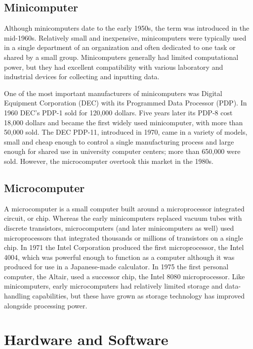 \documentclass[11pt,a4paper,twoside]{article}
\begin{document}
\subsection{Minicomputer}
Although minicomputers date to the early 1950s, the term was introduced in the mid-1960s. Relatively small and inexpensive, minicomputers were typically used in a single department of an organization and often dedicated to one task or shared by a small group. Minicomputers generally had limited computational power, but they had excellent compatibility with various laboratory and industrial devices for collecting and inputting data.\par
One of the most important manufacturers of minicomputers was Digital Equipment Corporation (DEC) with its Programmed Data Processor (PDP). In 1960 DEC’s PDP-1 sold for 120,000 dollars. Five years later its PDP-8 cost 18,000 dollars and became the first widely used minicomputer, with more than 50,000 sold. The DEC PDP-11, introduced in 1970, came in a variety of models, small and cheap enough to control a single manufacturing process and large enough for shared use in university computer centers; more than 650,000 were sold. However, the microcomputer overtook this market in the 1980s.
\subsection{Microcomputer}
A microcomputer is a small computer built around a microprocessor integrated circuit, or chip. Whereas the early minicomputers replaced vacuum tubes with discrete transistors, microcomputers (and later minicomputers as well) used microprocessors that integrated thousands or millions of transistors on a single chip. In 1971 the Intel Corporation produced the first microprocessor, the Intel 4004, which was powerful enough to function as a computer although it was produced for use in a Japanese-made calculator. In 1975 the first personal computer, the Altair, used a successor chip, the Intel 8080 microprocessor. Like minicomputers, early microcomputers had relatively limited storage and data-handling capabilities, but these have grown as storage technology has improved alongside processing power.
\section{Hardware and Software}
\end{document}
